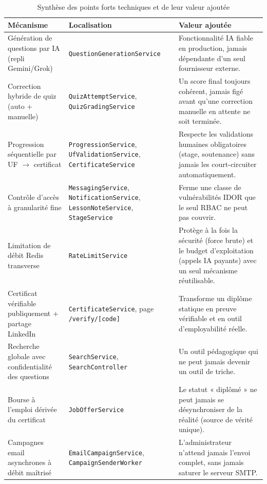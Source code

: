 \begin{table}[H]
  \centering
  \small
  \caption{Synthèse des points forts techniques et de leur valeur ajoutée}
  \label{tab:synthese-points-forts}
  \begin{tabular}{@{}p{2.6cm}p{4.1cm}p{6.3cm}@{}}
    \toprule
    Mécanisme & Localisation & Valeur ajoutée \\
    \midrule
    Génération de questions par IA (repli Gemini/Grok) & \texttt{Question\allowbreak Generation\allowbreak Service} & Fonctionnalité IA fiable en production, jamais dépendante d'un seul fournisseur externe. \\
    Correction hybride de quiz (auto + manuelle) & \texttt{QuizAttempt\allowbreak Service}, \texttt{QuizGrading\allowbreak Service} & Un score final toujours cohérent, jamais figé avant qu'une correction manuelle en attente ne soit terminée. \\
    Progression séquentielle par UF $\rightarrow$ certificat & \texttt{Progression\allowbreak Service}, \texttt{UfValidation\allowbreak Service}, \texttt{Certificate\allowbreak Service} & Respecte les validations humaines obligatoires (stage, soutenance) sans jamais les court-circuiter automatiquement. \\
    Contrôle d'accès à granularité fine & \texttt{Messaging\allowbreak Service}, \texttt{Notification\allowbreak Service}, \texttt{LessonNote\allowbreak Service}, \texttt{Stage\allowbreak Service} & Ferme une classe de vulnérabilités IDOR que le seul RBAC ne peut pas couvrir. \\
    Limitation de débit Redis transverse & \texttt{RateLimit\allowbreak Service} & Protège à la fois la sécurité (force brute) et le budget d'exploitation (appels IA payants) avec un seul mécanisme réutilisable. \\
    Certificat vérifiable publiquement + partage LinkedIn & \texttt{Certificate\allowbreak Service}, page \texttt{/verify/[code]} & Transforme un diplôme statique en preuve vérifiable et en outil d'employabilité réelle. \\
    Recherche globale avec confidentialité des questions & \texttt{Search\allowbreak Service}, \texttt{Search\allowbreak Controller} & Un outil pédagogique qui ne peut jamais devenir un outil de triche. \\
    Bourse à l'emploi dérivée du certificat & \texttt{JobOffer\allowbreak Service} & Le statut « diplômé » ne peut jamais se désynchroniser de la réalité (source de vérité unique). \\
    Campagnes email asynchrones à débit maîtrisé & \texttt{EmailCampaign\allowbreak Service}, \texttt{CampaignSender\allowbreak Worker} & L'administrateur n'attend jamais l'envoi complet, sans jamais saturer le serveur SMTP. \\

\end{tabular}
\end{table}

